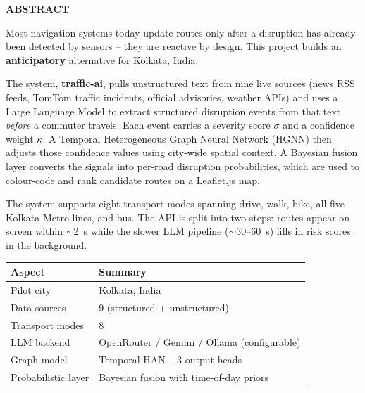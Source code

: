 \thispagestyle{front}
\vspace*{0.5cm}
\begin{center}
  \textbf{\Large ABSTRACT}
\end{center}
\vspace{1cm}

\noindent
Most navigation systems today update routes only after a disruption has already
been detected by sensors -- they are reactive by design. This project builds an
\textbf{anticipatory} alternative for Kolkata, India.

\vspace{0.5cm}
\noindent
The system, \textbf{traffic-ai}, pulls unstructured text from nine live sources
(news RSS feeds, TomTom traffic incidents, official advisories, weather APIs)
and uses a Large Language Model to extract structured disruption events from that
text \textit{before} a commuter travels. Each event carries a severity score
$\sigma$ and a confidence weight $\kappa$. A Temporal Heterogeneous Graph Neural
Network (HGNN) then adjusts those confidence values using city-wide spatial
context. A Bayesian fusion layer converts the signals into per-road disruption
probabilities, which are used to colour-code and rank candidate routes on a
Leaflet.js map.

\vspace{0.5cm}
\noindent
The system supports eight transport modes spanning drive, walk, bike, all five
Kolkata Metro lines, and bus. The API is split into two steps: routes appear on
screen within $\sim$2~s while the slower LLM pipeline ($\sim$30--60~s) fills in
risk scores in the background.

\vspace{0.5cm}

\begin{table}[H]
\centering
\begin{tabular}{ll}
\toprule
\textbf{Aspect} & \textbf{Summary} \\
\midrule
Pilot city          & Kolkata, India \\
Data sources        & 9 (structured + unstructured) \\
Transport modes     & 8 \\
LLM backend         & OpenRouter / Gemini / Ollama (configurable) \\
Graph model         & Temporal HAN -- 3 output heads \\
Probabilistic layer & Bayesian fusion with time-of-day priors \\
\bottomrule
\end{tabular}
\end{table}

\newpage
